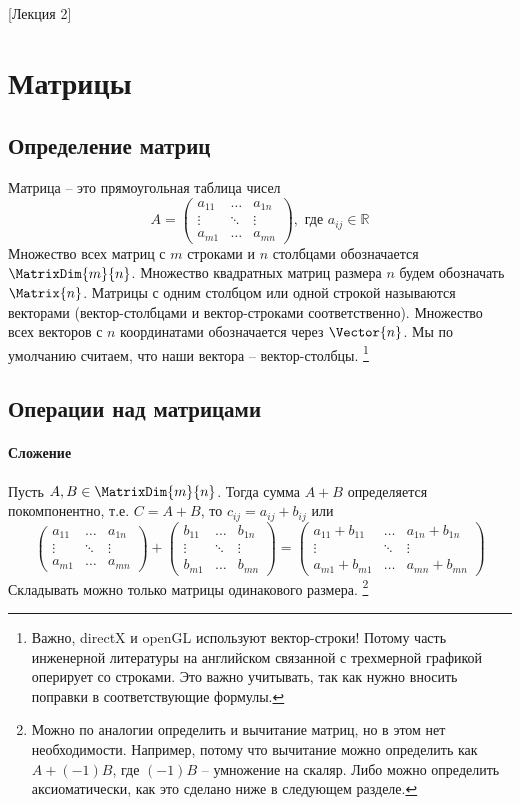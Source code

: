 [Лекция 2]

\newpage

\section{Матрицы}

\subsection{Определение матриц}

Матрица -- это прямоугольная таблица чисел
\[
A=
\begin{pmatrix}
a_{11}&\ldots& a_{1n}\\
\vdots&\ddots&\vdots\\
a_{m1}& \ldots &a_{mn}
\end{pmatrix},\text{ где } a_{ij}\in \mathbb R
\]
Множество всех матриц с $m$ строками и $n$ столбцами обозначается $\MatrixDim{m}{n}$.
Множество квадратных матриц размера $n$ будем обозначать $\Matrix{n}$.
Матрицы с одним столбцом или одной строкой называются векторами (вектор-столбцами и вектор-строками соответственно).
Множество всех векторов с $n$ координатами обозначается через $\Vector{n}$.
Мы по умолчанию считаем, что наши вектора -- вектор-столбцы.%
\footnote{Важно, directX и openGL используют вектор-строки!
Потому часть инженерной литературы на английском связанной с трехмерной графикой оперирует со строками.
Это важно учитывать, так как нужно вносить поправки в соответствующие формулы.}

\subsection{Операции над матрицами}

\paragraph{Сложение}
Пусть $A,B\in \MatrixDim{m}{n}$.
Тогда сумма $A+B$ определяется покомпонентно, т.е. $C = A + B$, то $c_{ij} = a_{ij} + b_{ij}$ или
\[
\begin{pmatrix}
a_{11}&\ldots& a_{1n}\\
\vdots&\ddots&\vdots\\
a_{m1}& \ldots &a_{mn}
\end{pmatrix}
+
\begin{pmatrix}
b_{11}&\ldots& b_{1n}\\
\vdots&\ddots&\vdots\\
b_{m1}& \ldots &b_{mn}
\end{pmatrix}
=
\begin{pmatrix}
a_{11}+b_{11}&\ldots& a_{1n} + b_{1n}\\
\vdots&\ddots&\vdots\\
a_{m1}+b_{m1}& \ldots &a_{mn} + b_{mn}
\end{pmatrix}
\]
Складывать можно только матрицы одинакового размера.%
\footnote{Можно по аналогии определить и вычитание матриц, но в этом нет необходимости.
Например, потому что вычитание можно определить как $A + (-1)B$, где $(-1)B$ -- умножение на скаляр.
Либо можно определить аксиоматически, как это сделано ниже в следующем разделе.}

